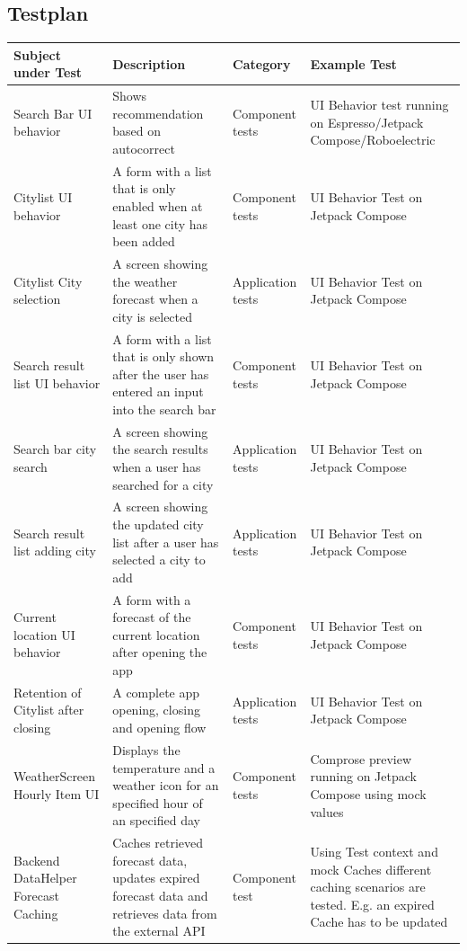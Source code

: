 \documentclass{article}
\begin{document}
\subsection{Testplan}
\begin{center}
  \begin{tabularx}{\textwidth}{|X|l|X|l|}
    \hline
    \textbf{Subject under Test} & \textbf{Description} & \textbf{Category} & \textbf{Example Test} \\
    \hline
    Search Bar UI behavior & Shows recommendation based on autocorrect & Component tests & UI Behavior test running on Espresso/Jetpack Compose/Roboelectric  \\
    \hline
   Citylist UI behavior  & A form with a list that is only enabled when at least one city has been added & Component tests & UI Behavior Test on Jetpack Compose \\
    \hline
    Citylist City selection & A screen showing the weather forecast when a city is selected & Application tests & UI Behavior Test on Jetpack Compose \\
    \hline
    Search result list UI behavior & A form with a list that is only shown after the user has entered an input into the search bar & Component tests & UI Behavior Test on Jetpack Compose  \\
    \hline
    Search bar city search & A screen showing the search results when a user has searched for a city & Application tests & UI Behavior Test on Jetpack Compose \\
    \hline
    Search result list adding city & A screen showing the updated city list after a user has selected a city to add & Application tests & UI Behavior Test on Jetpack Compose \\
    \hline
    Current location UI behavior & A form with a forecast of the current location after opening the app & Component tests & UI Behavior Test on Jetpack Compose \\
    \hline
    Retention of Citylist after closing & A complete app opening, closing and opening flow & Application tests & UI Behavior Test on Jetpack Compose \\
    \hline
    WeatherScreen Hourly Item UI & Displays the temperature and a weather icon for an specified hour of an specified day & Component tests & Comprose preview running on Jetpack Compose using mock values \\
    \hline
    Backend DataHelper Forecast Caching & Caches retrieved forecast data, updates expired forecast data and retrieves data from the external API & Component test & Using Test context and mock Caches different caching scenarios are tested. E.g. an expired Cache has to be updated\\

\end{tabularx}
\end{center}
\end{document}
